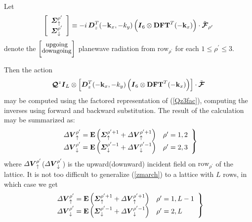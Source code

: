 Let
\begin{equation} \label{zsource}
\left[\begin{array}{c}
{\mbox{\boldmath$\mit \Sigma$\unboldmath}}^{\rho^{\prime}}_{\uparrow}\\
{\mbox{\boldmath$\mit \Sigma$\unboldmath}}^{\rho^{\prime}}_{\downarrow}
\end{array}  \right]\equiv
-i\,
{\mbox{\boldmath$\mit D$\unboldmath}}^{T}_{z}(-{\bf k}_{x},-{k}_{y})\left({\mbox{\boldmath$\mit I$\unboldmath}}_6\otimes
{\bf DFT}^{T}(-{\bf k}_{x})  \right)\cdot \tilde{\mbox{\boldmath$\cal F$\unboldmath}}_{\rho^{\prime}}
\end{equation}
denote the $\left[{\stackrel{\mbox{\small upgoing}}{{}_{\mbox{\small 
downgoing}}}}\right]$ planewave radiation from $\mbox{row}_{\rho^{\prime}}$
for each  $1 \le {\rho^{\prime}} \le 3$.

 
Then the action 
\[
{\mbox{\boldmath$\cal Q$\unboldmath}}^{z}
 {\mbox{\boldmath$\mit I$\unboldmath}}_L \otimes \left[
{\mbox{\boldmath$\mit D$\unboldmath}}^{T}_{z}(-{\bf k}_{x},-{k}_{y})\left({\mbox{\boldmath$\mit I$\unboldmath}}_6\otimes
{\bf DFT}^{T}(-{\bf k}_{x})  \right)\right]\cdot \tilde{\mbox{\boldmath$\cal F$\unboldmath}}
\]
may be computed using the 
factored representation of (\ref{Qz3fac}), computing the inverses using 
forward and backward substitution. The result of the calculation may be 
summarized as:
\begin{equation} \label{zmarch}
\left.\begin{array}{cc}
{\mit \Delta} { \mbox{\boldmath$\mit V$\unboldmath}}_{\uparrow }^{  {\rho^{\prime}}}  = {\bf E}\left({{ \mbox{\boldmath$\mit \Sigma$\unboldmath}}_{ \uparrow }^{{\rho^{\prime}}+1}+ {\mit \Delta} {\mbox{\boldmath$\mit V$\unboldmath}}_{\uparrow }^{  
{\rho^{\prime}}+1}}\right)&{\rho^{\prime}}=1,2\\
{\mit \Delta} {\mbox{\boldmath$\mit V$\unboldmath}}_{\downarrow }^{  {\rho^{\prime}}} ={\bf E}\left({{ \mbox{\boldmath$\mit \Sigma$\unboldmath}}_{ \downarrow }^{{\rho^{\prime}}-1}+ {\mit \Delta} { \mbox{\boldmath$\mit V$\unboldmath}}_{\downarrow }^{{\rho^{\prime}}-1}}
\right)& {\rho^{\prime}}=2,3
\end{array}\right\}
\end{equation} 
where ${\mit \Delta} { \mbox{\boldmath$\mit V$\unboldmath}}_{\uparrow }^{  {\rho^{\prime}}}$(${\mit \Delta} { \mbox{\boldmath$\mit V$\unboldmath}}_{\downarrow }^{  {\rho^{\prime}}}$) is the upward(downward) incident field on 
$\mbox{row}_{\rho^{\prime}}$ of the lattice. It is not too difficult to generalize 
(\ref{zmarch}) to a lattice with $L$ rows, in which case we get
\begin{equation} \label{zmarchL}
\left.\begin{array}{cl}
{\mit \Delta} { \mbox{\boldmath$\mit V$\unboldmath}}_{\uparrow }^{  {\rho^{\prime}}}  = {\bf E}\left({{ \mbox{\boldmath$\mit \Sigma$\unboldmath}}_{ \uparrow }^{{\rho^{\prime}}+1}+ {\mit \Delta} {\mbox{\boldmath$\mit V$\unboldmath}}_{\uparrow }^{  
{\rho^{\prime}}+1}}\right)&{\rho^{\prime}}=1,L-1\\
{\mit \Delta} {\mbox{\boldmath$\mit V$\unboldmath}}_{\downarrow }^{  {\rho^{\prime}}} ={\bf E}\left({{ \mbox{\boldmath$\mit \Sigma$\unboldmath}}_{ \downarrow }^{{\rho^{\prime}}-1}+ {\mit \Delta} { \mbox{\boldmath$\mit V$\unboldmath}}_{\downarrow }^{{\rho^{\prime}}-1}}
\right)& {\rho^{\prime}}=2,L
\end{array}\right\}
\end{equation} 

